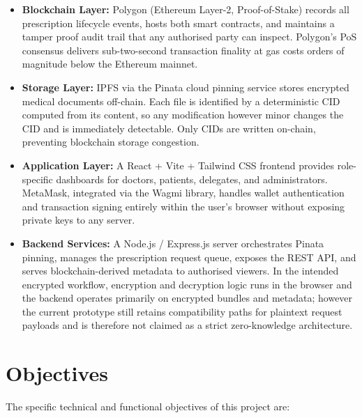 \documentclass[12pt,a4wide]{report}
\begin{document}
\begin{itemize}
  \item \textbf{Blockchain Layer:} Polygon (Ethereum Layer-2, Proof-of-Stake)
    records all prescription lifecycle events, hosts both smart contracts, and
    maintains a tamper proof audit trail that any authorised party can inspect.
    Polygon's PoS consensus delivers sub-two-second transaction finality at gas
    costs orders of magnitude below the Ethereum mainnet.
  \item \textbf{Storage Layer:} IPFS via the Pinata cloud pinning service stores
    encrypted medical documents off-chain. Each file is identified by a
    deterministic CID computed from its content, so any modification however
    minor changes the CID and is immediately detectable. Only CIDs are written
    on-chain, preventing blockchain storage congestion.
  \item \textbf{Application Layer:} A React + Vite + Tailwind CSS frontend
    provides role-specific dashboards for doctors, patients, delegates, and
    administrators. MetaMask, integrated via the Wagmi library, handles wallet
    authentication and transaction signing entirely within the user's browser
    without exposing private keys to any server.
  \item \textbf{Backend Services:} A Node.js / Express.js server orchestrates
    Pinata pinning, manages the prescription request queue, exposes the REST API,
    and serves blockchain-derived metadata to authorised viewers. In the intended
    encrypted workflow, encryption and decryption logic runs in the browser and
    the backend operates primarily on encrypted bundles and metadata; however the
    current prototype still retains compatibility paths for plaintext request
    payloads and is therefore not claimed as a strict zero-knowledge architecture.
\end{itemize}

\section{Objectives}

The specific technical and functional objectives of this project are:
\end{document}
